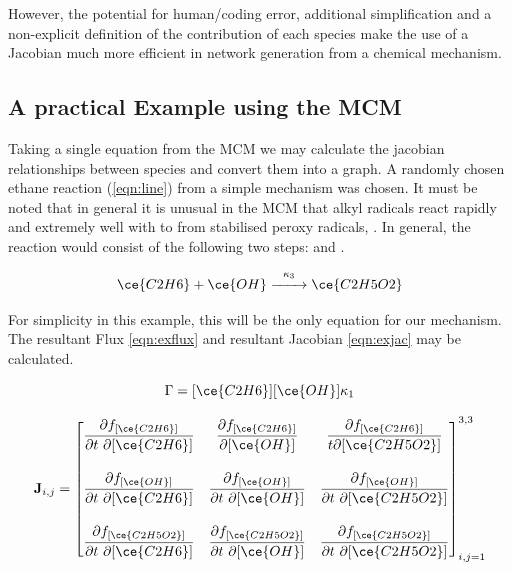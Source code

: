 However, the potential for human/coding error, additional simplification and a non-explicit definition of the contribution of each species make the use of a Jacobian much more efficient in network generation from a chemical mechanism. 


\subsection{A practical Example using the MCM}\label{sec:jacpractical}

Taking a single equation from the MCM we may calculate the jacobian relationships between species and convert them into a graph. A randomly chosen ethane reaction (\autoref{eqn:line}) from a simple mechanism was chosen. It must be noted that in general it is unusual in the MCM that alkyl radicals react rapidly and extremely well with  to from stabilised peroxy radicals, \citep{mcmorigin}. In general, the reaction would consist of the following two steps:
and .

\begin{equation}
\label{eqn:line}
\ce{C2H6} + \ce{OH} \overset{\kappa_3}{\xrightarrow{\hspace*{7mm}}} \ce{C2H5O2}
\end{equation}

For simplicity in this example, this will be the only equation for our mechanism. The resultant Flux \autoref{eqn:exflux} and resultant Jacobian \autoref{eqn:exjac} may be calculated.

\begin{equation}\label{eqn:exflux}
   \Gamma = [\ce{C2H6}][\ce{OH}]\kappa_1 \\[15pt]
\end{equation}

   \begin{eqnarray}
    \mathbf{J}_{i,j} =
 \begin{bmatrix}
   \dfrac{\partial f_{[\ce{C2H6}]}}{\partial t \ \partial {[\ce{C2H6}]}} &
     \dfrac{\partial f_{[\ce{C2H6}]}}{\partial {[\ce{OH}]}} &
     \dfrac{\partial f_{[\ce{C2H6}]}}{ t \partial {[\ce{C2H5O2}]}} \\[20pt]
   \dfrac{\partial f_{[\ce{OH}]}}{\partial t \ \partial {[\ce{C2H6}]}} &
     \dfrac{\partial f_{[\ce{OH}]}}{\partial t \ \partial {[\ce{OH}]}} &
   \dfrac{\partial f_{[\ce{OH}]}}{\partial t \ \partial {[\ce{C2H5O2}]}} \\[20pt]
   \dfrac{\partial f_{[\ce{C2H5O2}]}}{\partial t \ \partial {[\ce{C2H6}]}} &
     \dfrac{\partial f_{[\ce{C2H5O2}]}}{\partial t \ \partial {[\ce{OH}]}} &
     \dfrac{\partial f_{[\ce{C2H5O2}]}}{\partial t \ \partial {[\ce{C2H5O2}]}}
 \end{bmatrix}_{i,j=1}^{3,3}
 \label{eqn:exjac}
\end{eqnarray}\\


